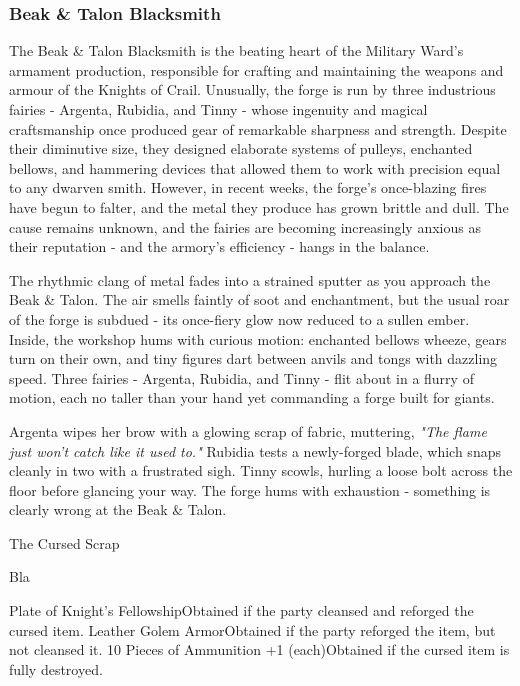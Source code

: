 \subsubsection*{ Beak \& Talon Blacksmith}
{\entryfont The Beak \& Talon Blacksmith is the beating heart of the Military Ward's armament production, responsible for crafting and maintaining the weapons and armour of the Knights of Crail. Unusually, the forge is run by three industrious fairies - Argenta, Rubidia, and Tinny - whose ingenuity and magical craftsmanship once produced gear of remarkable sharpness and strength. Despite their diminutive size, they designed elaborate systems of pulleys, enchanted bellows, and hammering devices that allowed them to work with precision equal to any dwarven smith. However, in recent weeks, the forge's once-blazing fires have begun to falter, and the metal they produce has grown brittle and dull. The cause remains unknown, and the fairies are becoming increasingly anxious as their reputation - and the armory's efficiency - hangs in the balance.}
\begin{DndReadAloud}
	The rhythmic clang of metal fades into a strained sputter as you approach the Beak \& Talon. The air smells faintly of soot and enchantment, but the usual roar of the forge is subdued - its once-fiery glow now reduced to a sullen ember. Inside, the workshop hums with curious motion: enchanted bellows wheeze, gears turn on their own, and tiny figures dart between anvils and tongs with dazzling speed. Three fairies - Argenta, Rubidia, and Tinny - flit about in a flurry of motion, each no taller than your hand yet commanding a forge built for giants.

	Argenta wipes her brow with a glowing scrap of fabric, muttering, \textit{"The flame just won't catch like it used to."} Rubidia tests a newly-forged blade, which snaps cleanly in two with a frustrated sigh. Tinny scowls, hurling a loose bolt across the floor before glancing your way. The forge hums with exhaustion - something is clearly wrong at the Beak \& Talon.
\end{DndReadAloud}
\begin{DndQuestHook}[width=0.5\textwidth - 4pt]{The Cursed Scrap}
	\DndQuestHookBasics[%
		location = {Beak \& Talon Blacksmith (Citadel of Crail)},
		quest-giver = {Steelsisters (Fairy Smiths)},
		objective = {Deal with the cursed item.}
	]
	
	{\noindent\entryfont Bla}
	
	{%
		{Plate of Knight's Fellowship}{Obtained if the party cleansed and reforged the cursed item.}%
		{Leather Golem Armor}{Obtained if the party reforged the item, but not cleansed it.}%
		{10 Pieces of Ammunition +1 (each)}{Obtained if the cursed item is fully destroyed.}%
	}%
\end{DndQuestHook}
